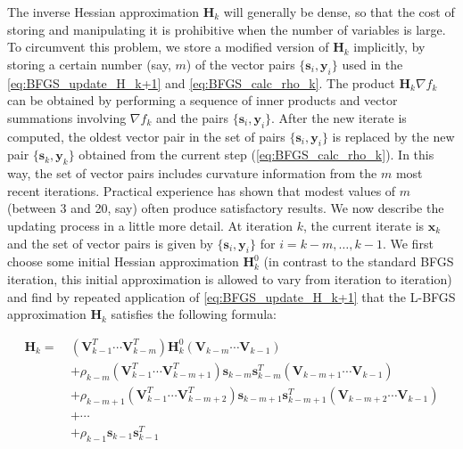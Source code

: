 The inverse Hessian approximation $\textbf{H}_{k}$ will generally be dense, so that the cost of storing and manipulating it is prohibitive when the number of variables is large. To circumvent this problem, we store a modified version of $\textbf{H}_{k}$ implicitly, by storing a certain number (say, $m$) of the vector pairs $\{\textbf{s}_i, \textbf{y}_i\}$ used in the \cref{eq:BFGS_update_H_k+1} and \cref{eq:BFGS_calc_rho_k}. The product $\textbf{H}_{k} \nabla f_k$ can be obtained by performing a sequence of inner products and vector summations involving $\nabla f_k$ and the pairs $\{\textbf{s}_i, \textbf{y}_i\}$. After the new iterate is computed, the oldest vector pair in the set of pairs $\{\textbf{s}_i, \textbf{y}_i\}$ is replaced by the new pair $\{\textbf{s}_k, \textbf{y}_k\}$ obtained from the current step (\cref{eq:BFGS_calc_rho_k}). In this way, the set of vector pairs includes curvature information from the $m$ most recent iterations. Practical experience has shown that modest values of $m$ (between 3 and 20, say) often produce satisfactory results. We now describe the updating process in a little more detail. At iteration $k$, the current iterate is $\textbf{x}_k$ and the set of vector pairs is given by $\{\textbf{s}_i, \textbf{y}_i\}$ for $i=k-m,\ldots,k-1$. We first choose some initial Hessian approximation $\textbf{H}_{k}^0$ (in contrast to the standard BFGS iteration, this initial approximation is allowed to vary from iteration to iteration) and find by repeated application of \cref{eq:BFGS_update_H_k+1} that the L-BFGS approximation $\textbf{H}_{k}$ satisfies the following formula: \cite{Nocedal2006}

\begin{align}
  \textbf{H}_{k} =\  & (\textbf{V}_{k-1}^T \cdots \textbf{V}_{k-m}^T) \textbf{H}_{k}^0 (\textbf{V}_{k-m} \cdots \textbf{V}_{k-1})                                  \nonumber          \\
                     & + \rho_{k-m} (\textbf{V}_{k-1}^T \cdots \textbf{V}_{k-m+1}^T) \textbf{s}_{k-m} \textbf{s}_{k-m}^T (\textbf{V}_{k-m+1} \cdots \textbf{V}_{k-1}) \nonumber       \\
                     & + \rho_{k-m+1} (\textbf{V}_{k-1}^T \cdots \textbf{V}_{k-m+2}^T) \textbf{s}_{k-m+1} \textbf{s}_{k-m+1}^T (\textbf{V}_{k-m+2} \cdots \textbf{V}_{k-1}) \nonumber \\
                     & + \cdots \nonumber                                                                                                                                             \\
                     & + \rho_{k-1} \textbf{s}_{k-1} \textbf{s}_{k-1}^T
\end{align}

